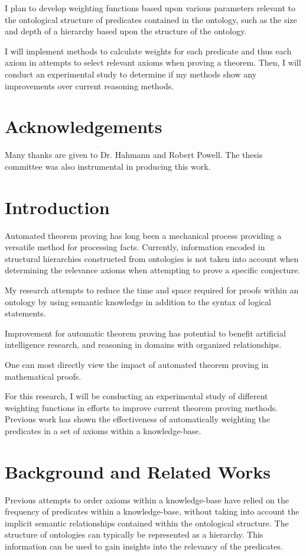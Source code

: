 \documentclass{article}
\begin{document}
I plan to develop weighting functions based upon various parameters relevant to the ontological structure of predicates contained in the ontology, such as the size and depth of a hierarchy based upon the structure of the ontology. 

I will implement methods to calculate weights for each predicate and thus each axiom in attempts to select relevant axioms when proving a theorem. Then, I will conduct an experimental study to determine if my methods show any improvements over current reasoning methods. 
\newpage
\section{Acknowledgements}
Many thanks are given to Dr. Hahmann and Robert Powell. The thesis committee was also instrumental in producing this work. 
\newpage
\section{Introduction}
Automated theorem proving has long been a mechanical process providing a versatile method for processing facts. Currently, information encoded in structural hierarchies constructed from ontologies is not taken into account when determining the relevance axioms when attempting to prove a specific conjecture. 

My research attempts to reduce the time and space required for proofs within an ontology by using semantic knowledge in addition to the syntax of logical statements. 

Improvement for automatic theorem proving has potential to benefit artificial intelligence research, and reasoning in domains with organized relationships. 

One can most directly view the impact of automated theorem proving in mathematical proofs. 

For this research, I will be conducting an experimental study of different weighting functions in efforts to improve current theorem proving methods. Previous work has shown the effectiveness of automatically weighting the predicates in a set of axioms within a knowledge-base.

\newpage
\section{Background and Related Works}

Previous attempts to order axioms within a knowledge-base have relied on the frequency of predicates within a knowledge-base, without taking into account the implicit semantic relationships contained within the ontological structure. The structure of ontologies can typically be represented as a hierarchy. This information can be used to gain insights into the relevancy of the predicates. 
\end{document}
